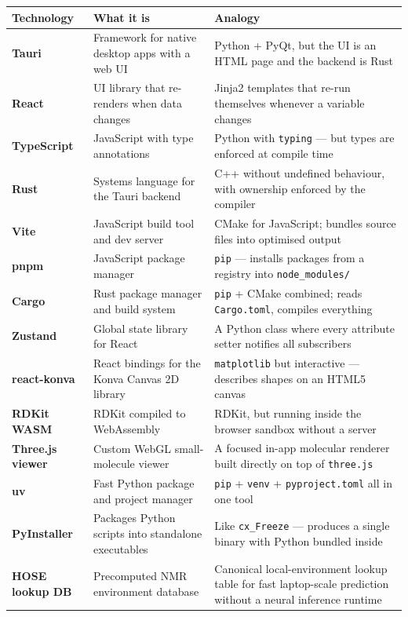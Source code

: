 \documentclass[11pt,a4paper]{article}
\begin{document}
\begin{table}[h!]
\centering
\begin{tabularx}{\textwidth}{@{} l l X @{}}
\toprule
\textbf{Technology} & \textbf{What it is} & \textbf{Analogy} \\
\midrule
\textbf{Tauri} & Framework for native desktop apps with a web UI
  & Python + PyQt, but the UI is an HTML page and the backend is Rust \\
\textbf{React} & UI library that re-renders when data changes
  & Jinja2 templates that re-run themselves whenever a variable changes \\
\textbf{TypeScript} & JavaScript with type annotations
  & Python with \texttt{typing} --- but types are enforced at compile time \\
\textbf{Rust} & Systems language for the Tauri backend
  & C++ without undefined behaviour, with ownership enforced by the compiler \\
\textbf{Vite} & JavaScript build tool and dev server
  & CMake for JavaScript; bundles source files into optimised output \\
\textbf{pnpm} & JavaScript package manager
  & \texttt{pip} --- installs packages from a registry into \texttt{node\_modules/} \\
\textbf{Cargo} & Rust package manager and build system
  & \texttt{pip} + CMake combined; reads \texttt{Cargo.toml}, compiles everything \\
\textbf{Zustand} & Global state library for React
  & A Python class where every attribute setter notifies all subscribers \\
\textbf{react-konva} & React bindings for the Konva Canvas 2D library
  & \texttt{matplotlib} but interactive --- describes shapes on an HTML5 canvas \\
\textbf{RDKit WASM} & RDKit compiled to WebAssembly
  & RDKit, but running inside the browser sandbox without a server \\
\textbf{Three.js viewer} & Custom WebGL small-molecule viewer
  & A focused in-app molecular renderer built directly on top of \texttt{three.js} \\
\textbf{uv} & Fast Python package and project manager
  & \texttt{pip} + \texttt{venv} + \texttt{pyproject.toml} all in one tool \\
\textbf{PyInstaller} & Packages Python scripts into standalone executables
  & Like \texttt{cx\_Freeze} --- produces a single binary with Python bundled inside \\
\textbf{HOSE lookup DB} & Precomputed NMR environment database
  & Canonical local-environment lookup table for fast laptop-scale prediction without a
    neural inference runtime \\
\bottomrule
\end{tabularx}
\end{table}
\end{document}

